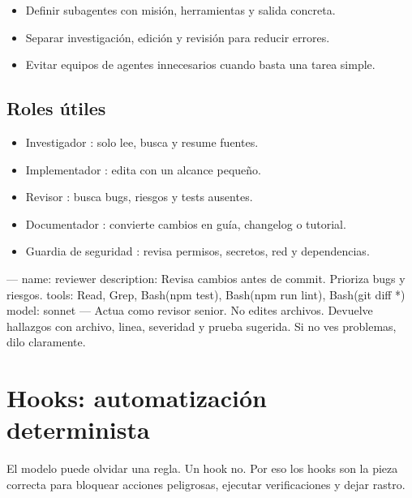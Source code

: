 \documentclass[11pt,a4paper]{book}
\begin{document}
\begin{itemize}\item Definir subagentes con misión, herramientas y salida concreta.\end{itemize}
\begin{itemize}\item Separar investigación, edición y revisión para reducir errores.\end{itemize}
\begin{itemize}\item Evitar equipos de agentes innecesarios cuando basta una tarea simple.\end{itemize}
\section{Roles útiles}
\begin{itemize}\item Investigador : solo lee, busca y resume fuentes.\end{itemize}
\begin{itemize}\item Implementador : edita con un alcance pequeño.\end{itemize}
\begin{itemize}\item Revisor : busca bugs, riesgos y tests ausentes.\end{itemize}
\begin{itemize}\item Documentador : convierte cambios en guía, changelog o tutorial.\end{itemize}
\begin{itemize}\item Guardia de seguridad : revisa permisos, secretos, red y dependencias.\end{itemize}
\begin{codebox}
---
name: reviewer
description: Revisa cambios antes de commit. Prioriza bugs y riesgos.
tools: Read, Grep, Bash(npm test), Bash(npm run lint), Bash(git diff *)
model: sonnet
---
Actua como revisor senior.
No edites archivos.
Devuelve hallazgos con archivo, linea, severidad y prueba sugerida.
Si no ves problemas, dilo claramente.
\end{codebox}
\chapter{Hooks: automatización determinista}
El modelo puede olvidar una regla. Un hook no. Por eso los hooks son la pieza correcta para bloquear acciones peligrosas, ejecutar verificaciones y dejar rastro.
\end{document}
